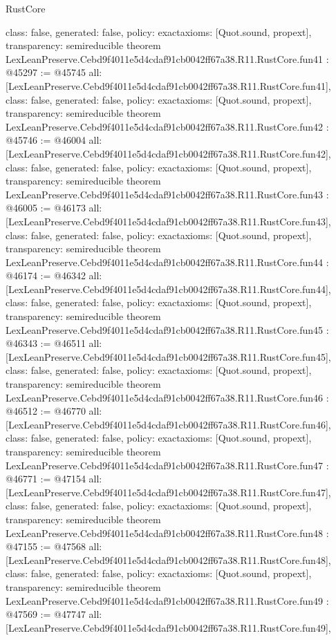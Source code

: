 \begin{lexlean}{RustCore}
\begin{coremodule}
{  class: false,
  generated: false,
  policy: exact{axioms: [Quot.sound, propext]},
  transparency: semireducible
}
theorem LexLeanPreserve.Cebd9f4011e5d4cdaf91cb0042ff67a38.R11.RustCore.fun41 : @45297 := @45745 {
  all: [LexLeanPreserve.Cebd9f4011e5d4cdaf91cb0042ff67a38.R11.RustCore.fun41],
  class: false,
  generated: false,
  policy: exact{axioms: [Quot.sound, propext]},
  transparency: semireducible
}
theorem LexLeanPreserve.Cebd9f4011e5d4cdaf91cb0042ff67a38.R11.RustCore.fun42 : @45746 := @46004 {
  all: [LexLeanPreserve.Cebd9f4011e5d4cdaf91cb0042ff67a38.R11.RustCore.fun42],
  class: false,
  generated: false,
  policy: exact{axioms: [Quot.sound, propext]},
  transparency: semireducible
}
theorem LexLeanPreserve.Cebd9f4011e5d4cdaf91cb0042ff67a38.R11.RustCore.fun43 : @46005 := @46173 {
  all: [LexLeanPreserve.Cebd9f4011e5d4cdaf91cb0042ff67a38.R11.RustCore.fun43],
  class: false,
  generated: false,
  policy: exact{axioms: [Quot.sound, propext]},
  transparency: semireducible
}
theorem LexLeanPreserve.Cebd9f4011e5d4cdaf91cb0042ff67a38.R11.RustCore.fun44 : @46174 := @46342 {
  all: [LexLeanPreserve.Cebd9f4011e5d4cdaf91cb0042ff67a38.R11.RustCore.fun44],
  class: false,
  generated: false,
  policy: exact{axioms: [Quot.sound, propext]},
  transparency: semireducible
}
theorem LexLeanPreserve.Cebd9f4011e5d4cdaf91cb0042ff67a38.R11.RustCore.fun45 : @46343 := @46511 {
  all: [LexLeanPreserve.Cebd9f4011e5d4cdaf91cb0042ff67a38.R11.RustCore.fun45],
  class: false,
  generated: false,
  policy: exact{axioms: [Quot.sound, propext]},
  transparency: semireducible
}
theorem LexLeanPreserve.Cebd9f4011e5d4cdaf91cb0042ff67a38.R11.RustCore.fun46 : @46512 := @46770 {
  all: [LexLeanPreserve.Cebd9f4011e5d4cdaf91cb0042ff67a38.R11.RustCore.fun46],
  class: false,
  generated: false,
  policy: exact{axioms: [Quot.sound, propext]},
  transparency: semireducible
}
theorem LexLeanPreserve.Cebd9f4011e5d4cdaf91cb0042ff67a38.R11.RustCore.fun47 : @46771 := @47154 {
  all: [LexLeanPreserve.Cebd9f4011e5d4cdaf91cb0042ff67a38.R11.RustCore.fun47],
  class: false,
  generated: false,
  policy: exact{axioms: [Quot.sound, propext]},
  transparency: semireducible
}
theorem LexLeanPreserve.Cebd9f4011e5d4cdaf91cb0042ff67a38.R11.RustCore.fun48 : @47155 := @47568 {
  all: [LexLeanPreserve.Cebd9f4011e5d4cdaf91cb0042ff67a38.R11.RustCore.fun48],
  class: false,
  generated: false,
  policy: exact{axioms: [Quot.sound, propext]},
  transparency: semireducible
}
theorem LexLeanPreserve.Cebd9f4011e5d4cdaf91cb0042ff67a38.R11.RustCore.fun49 : @47569 := @47747 {
  all: [LexLeanPreserve.Cebd9f4011e5d4cdaf91cb0042ff67a38.R11.RustCore.fun49],
}
\end{coremodule}
\end{lexlean}
